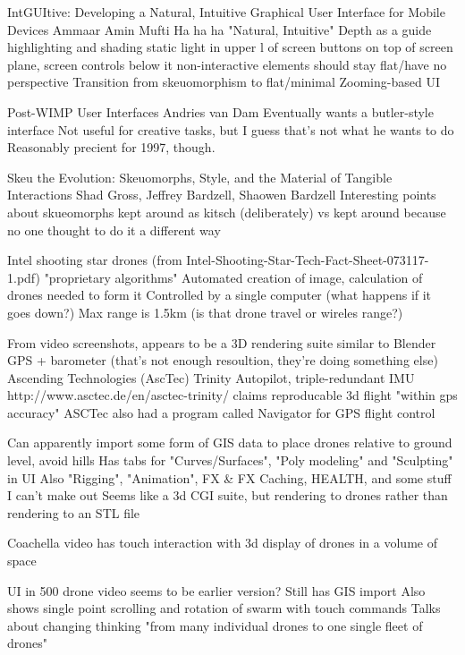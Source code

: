\citep{mufti2017intguitive}
IntGUItive: Developing a Natural, Intuitive Graphical User Interface for Mobile Devices
Ammaar Amin Mufti
	Ha ha ha "Natural, Intuitive"
	Depth as a guide
		highlighting and shading
		static light in upper l of screen
		buttons on top of screen plane, screen controls below it
		non-interactive elements should stay flat/have no perspective
	Transition from skeuomorphism to flat/minimal
	Zooming-based UI

\citep{van1997post}
Post-WIMP User Interfaces
Andries van Dam
	Eventually wants a butler-style interface
		Not useful for creative tasks, but I guess that's not what he wants to do
	Reasonably precient for 1997, though. 

\citep{gross2014skeu}
Skeu the Evolution: Skeuomorphs, Style, and the Material of Tangible Interactions
Shad Gross, Jeffrey Bardzell, Shaowen Bardzell
	Interesting points about skueomorphs kept around as kitsch (deliberately) vs kept around because no one thought to do it a different way

Intel shooting star drones (from Intel-Shooting-Star-Tech-Fact-Sheet-073117-1.pdf)
	"proprietary algorithms"
	Automated creation of image, calculation of drones needed to form it
	Controlled by a single computer (what happens if it goes down?)
	Max range is 1.5km (is that drone travel or wireles range?)

	From video screenshots, appears to be a 3D rendering suite similar to Blender
	GPS + barometer (that's not enough resoultion, they're doing something else)
		Ascending Technologies (AscTec) Trinity Autopilot, triple-redundant IMU
		http://www.asctec.de/en/asctec-trinity/ claims reproducable 3d flight "within gps accuracy"
		ASCTec also had a program called Navigator for GPS flight control

	Can apparently import some form of GIS data to place drones relative to ground level, avoid hills
	Has tabs for "Curves/Surfaces", "Poly modeling" and "Sculpting" in UI
	Also "Rigging", "Animation", FX \& FX Caching, HEALTH, and some stuff I can't make out
	Seems like a 3d CGI suite, but rendering to drones rather than rendering to an STL file

	Coachella video has touch interaction with 3d display of drones in a volume of space

	UI in 500 drone video seems to be earlier version? Still has GIS import
	Also shows single point scrolling and rotation of swarm with touch commands
	Talks about changing thinking "from many individual drones to one single fleet of drones"

